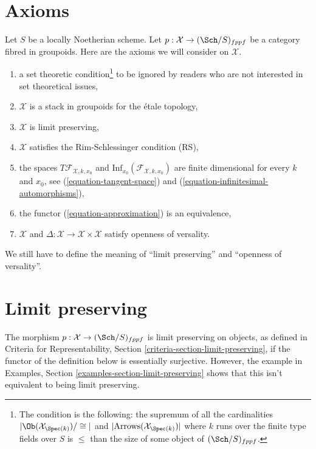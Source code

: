 \section{Axioms}
\label{section-axioms}

\noindent
Let $S$ be a locally Noetherian scheme. Let
$p : \mathcal{X} \to (\Sch/S)_{fppf}$ be a category fibred in groupoids.
Here are the axioms we will consider on $\mathcal{X}$.
\begin{enumerate}
\item[{[-1]}] a set theoretic condition\footnote{The condition is the
following: the supremum of all the cardinalities
$|\Ob(\mathcal{X}_{\Spec(k)})/\cong|$ and
$|\text{Arrows}(\mathcal{X}_{\Spec(k)})|$ where $k$ runs over the finite
type fields over $S$ is $\leq$ than the size of some
object of $(\Sch/S)_{fppf}$.} to be ignored by
readers who are not interested in set theoretical issues,
\item[{[0]}] $\mathcal{X}$ is a stack in groupoids for the \'etale topology,
\item[{[1]}] $\mathcal{X}$ is limit preserving,
\item[{[2]}] $\mathcal{X}$ satisfies the Rim-Schlessinger condition (RS),
\item[{[3]}] the spaces $T\mathcal{F}_{\mathcal{X}, k, x_0}$ and
$\text{Inf}_{x_0}(\mathcal{F}_{\mathcal{X}, k, x_0})$
are finite dimensional
for every $k$ and $x_0$, see
(\ref{equation-tangent-space}) and
(\ref{equation-infinitesimal-automorphisms}),
\item[{[4]}] the functor (\ref{equation-approximation}) is an equivalence,
\item[{[5]}] $\mathcal{X}$ and
$\Delta : \mathcal{X} \to \mathcal{X} \times \mathcal{X}$ satisfy
openness of versality.
\end{enumerate}
We still have to define the meaning of ``limit preserving'' and
``openness of versality''.






\section{Limit preserving}
\label{section-limits}

\noindent
The morphism $p : \mathcal{X} \to (\Sch/S)_{fppf}$ is limit preserving
on objects, as defined in Criteria for Representability, Section
\ref{criteria-section-limit-preserving}, if the functor of the definition
below is essentially surjective. However, the example
in Examples, Section \ref{examples-section-limit-preserving}
shows that this isn't equivalent to being limit preserving.

